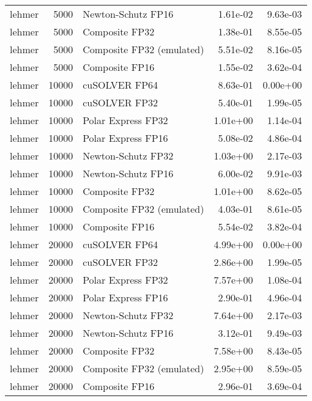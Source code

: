 \begin{table}
\begin{tabular}{lrlrr}
   lehmer &  5000 &        Newton-Schutz FP16 &  1.61e-02 &        9.63e-03 \\
   lehmer &  5000 &            Composite FP32 &  1.38e-01 &        8.55e-05 \\
   lehmer &  5000 & Composite FP32 (emulated) &  5.51e-02 &        8.16e-05 \\
   lehmer &  5000 &            Composite FP16 &  1.55e-02 &        3.62e-04 \\
   lehmer & 10000 &             cuSOLVER FP64 &  8.63e-01 &        0.00e+00 \\
   lehmer & 10000 &             cuSOLVER FP32 &  5.40e-01 &        1.99e-05 \\
   lehmer & 10000 &        Polar Express FP32 &  1.01e+00 &        1.14e-04 \\
   lehmer & 10000 &        Polar Express FP16 &  5.08e-02 &        4.86e-04 \\
   lehmer & 10000 &        Newton-Schutz FP32 &  1.03e+00 &        2.17e-03 \\
   lehmer & 10000 &        Newton-Schutz FP16 &  6.00e-02 &        9.91e-03 \\
   lehmer & 10000 &            Composite FP32 &  1.01e+00 &        8.62e-05 \\
   lehmer & 10000 & Composite FP32 (emulated) &  4.03e-01 &        8.61e-05 \\
   lehmer & 10000 &            Composite FP16 &  5.54e-02 &        3.82e-04 \\
   lehmer & 20000 &             cuSOLVER FP64 &  4.99e+00 &        0.00e+00 \\
   lehmer & 20000 &             cuSOLVER FP32 &  2.86e+00 &        1.99e-05 \\
   lehmer & 20000 &        Polar Express FP32 &  7.57e+00 &        1.08e-04 \\
   lehmer & 20000 &        Polar Express FP16 &  2.90e-01 &        4.96e-04 \\
   lehmer & 20000 &        Newton-Schutz FP32 &  7.64e+00 &        2.17e-03 \\
   lehmer & 20000 &        Newton-Schutz FP16 &  3.12e-01 &        9.49e-03 \\
   lehmer & 20000 &            Composite FP32 &  7.58e+00 &        8.43e-05 \\
   lehmer & 20000 & Composite FP32 (emulated) &  2.95e+00 &        8.59e-05 \\
   lehmer & 20000 &            Composite FP16 &  2.96e-01 &        3.69e-04 \\

\end{tabular}
\end{table}
